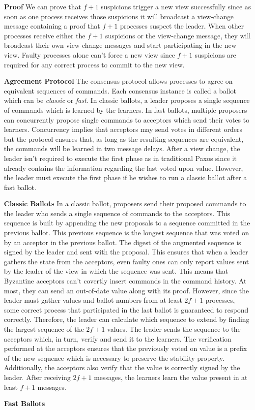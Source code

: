 \textbf{Proof} We can prove that $f+1$ suspicions trigger a new view successfully since as soon as one process receives those suspicions it will broadcast a view-change message containing a proof that $f+1$ processes suspect the leader. When other processes receive either the $f+1$ suspicions or the view-change message, they will broadcast their own view-change messages and start participating in the new view. Faulty processes alone can't force a new view since $f+1$ suspicions are required for any correct process to commit to the new view.\par
\textbf{Agreement Protocol} The consensus protocol allows processes to agree on equivalent sequences of commands. Each consensus instance is called a ballot which can be \textit{classic} or \textit{fast}. In classic ballots, a leader proposes a single sequence of commands which is learned by the learners. In fast ballots, multiple proposers can concurrently propose single commands to acceptors which send their votes to learners. Concurrency implies that acceptors may send votes in different orders but the protocol ensures that, as long as the resulting sequences are equivalent, the commands will be learned in two message delays. After a view change, the leader isn't required to execute the first phase as in traditional Paxos since it already contains the information regarding the last voted upon value. However, the leader must execute the first phase if he wishes to run a classic ballot after a fast ballot. \par
\textbf{Classic Ballots} In a classic ballot, proposers send their proposed commands to the leader who sends a single sequence of commands to the acceptors. This sequence is built by appending the new proposals to a sequence committed in the previous ballot. This previous sequence is the longest sequence that was voted on by an acceptor in the previous ballot. The digest of the augmented sequence is signed by the leader and sent with the proposal. This ensures that when a leader gathers the state from the acceptors, even faulty ones can only report values sent by the leader of the view in which the sequence was sent. This means that Byzantine acceptors can't covertly insert commands in the command history. At most, they can send an out-of-date value along with its proof. However, since the leader must gather values and ballot numbers from at least $2f+1$ processes, some correct process that participated in the last ballot is guaranteed to respond correctly. Therefore, the leader can calculate which sequence to extend by finding the largest sequence of the $2f+1$ values. The leader sends the sequence to the acceptors which, in turn, verify and send it to the learners. The verification performed at the acceptors ensures that the previously voted on value is a prefix of the new sequence which is necessary to preserve the stability property. Additionally, the acceptors also verify that the value is correctly signed by the leader. After receiving $2f+1$ messages, the learners learn the value present in at least $f+1$ messages. \par
\textbf{Fast Ballots}
